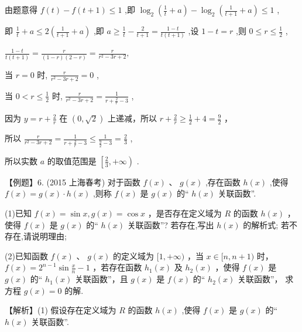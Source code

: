 \documentclass[10pt]{article}
\begin{document}
由题意得 \(f\left( t\right)  - f\left( {t + 1}\right)  \leq  1\) ,即 \({\log }_{2}\left( {\frac{1}{t} + a}\right)  - {\log }_{2}\left( {\frac{1}{t + 1} + a}\right)  \leq  1\) ,

即 \(\frac{1}{t} + a \leq  2\left( {\frac{1}{t + 1} + a}\right)\) ,即 \(a \geq  \frac{1}{t} - \frac{2}{t + 1} = \frac{1 - t}{t\left( {t + 1}\right) }\) ,设 \(1 - t = r\) ,则 \(0 \leq  r \leq  \frac{1}{2}\) ,

\(\frac{1 - t}{t\left( {t + 1}\right) } = \frac{r}{\left( {1 - r}\right) \left( {2 - r}\right) } = \frac{r}{{r}^{2} - {3r} + 2},\)

当 \(r = 0\) 时, \(\frac{r}{{r}^{2} - {3r} + 2} = 0\) ,

当 \(0 < r \leq  \frac{1}{2}\) 时, \(\frac{r}{{r}^{2} - {3r} + 2} = \frac{1}{r + \frac{2}{r} - 3}\) ,

因为 \(y = r + \frac{2}{r}\) 在 \(\left( {0,\sqrt{2}}\right)\) 上递减，所以 \(r + \frac{2}{r} \geq  \frac{1}{2} + 4 = \frac{9}{2}\) ，

所以 \(\frac{r}{{r}^{2} - {3r} + 2} = \frac{1}{r + \frac{2}{r} - 3} \leq  \frac{1}{\frac{9}{2} - 3} = \frac{2}{3}\) ,

所以实数 \(a\) 的取值范围是 \(\left\lbrack  {\frac{2}{3}, + \infty }\right)\) .

【例题】6. (2015 上海春考) 对于函数 \(f\left( x\right) \text{ 、 }g\left( x\right)\) ,存在函数 \(h\left( x\right)\) ,使得 \(f\left( x\right)  = g\left( x\right)  \cdot  h\left( x\right)\) ,则称 \(f\left( x\right)\) 是 \(g\left( x\right)\) 的“ \(h\left( x\right)\) 关联函数”.

(1)已知 \(f\left( x\right)  = \sin x,g\left( x\right)  = \cos x\) ，是否存在定义域为 \(R\) 的函数 \(h\left( x\right)\) ，使得 \(f\left( x\right)\) 是 \(g\left( x\right)\) 的“ \(h\left( x\right)\) 关联函数”? 若存在,写出 \(h\left( x\right)\) 的解析式; 若不存在,请说明理由;

(2)已知函数 \(f\left( x\right) \text{ 、 }g\left( x\right)\) 的定义域为 \(\lbrack 1, + \infty )\) ，当 \(x \in  \lbrack n,n + 1)\) 时， \(f\left( x\right)  = {2}^{n - 1}\sin \frac{x}{n} - 1\) ，若存在函数 \({h}_{1}\left( x\right)\) 及 \({h}_{2}\left( x\right)\) ，使得 \(f\left( x\right)\) 是 \(g\left( x\right)\) 的“ \({h}_{1}\left( x\right)\) 关联函数”，且 \(g\left( x\right)\) 是 \(f\left( x\right)\) 的“ \({h}_{2}\left( x\right)\) 关联函数”， 求方程 \(g\left( x\right)  = 0\) 的解.

【解析】(1) 假设存在定义域为 \(R\) 的函数 \(h\left( x\right)\) ,使得 \(f\left( x\right)\) 是 \(g\left( x\right)\) 的“ \(h\left( x\right)\) 关联函数”.
\end{document}
